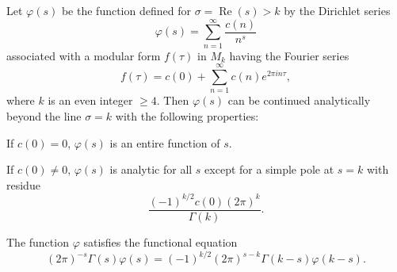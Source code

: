 Let $\varphi(s)$ be the function defined for $\sigma = \operatorname{Re}(s) > k$ by the Dirichlet series
$$\varphi(s) = \sum_{n=1}^{\infty} \frac{c(n)}{n^s}$$
associated with a modular form $f(\tau)$ in $M_k$ having the Fourier series
$$f(\tau) = c(0) + \sum_{n=1}^{\infty} c(n)e^{2\pi i n\tau},$$
where $k$ is an even integer $\geq 4$. Then $\varphi(s)$ can be continued analytically beyond the line $\sigma = k$ with the following properties:

 If $c(0) = 0$, $\varphi(s)$ is an entire function of $s$.

 If $c(0) \neq 0$, $\varphi(s)$ is analytic for all $s$ except for a simple pole at $s = k$ with residue
$$\frac{(-1)^{k/2}c(0)(2\pi)^k}{\Gamma(k)}.$$

 The function $\varphi$ satisfies the functional equation
$$(2\pi)^{-s}\Gamma(s)\varphi(s) = (-1)^{k/2}(2\pi)^{s-k}\Gamma(k-s)\varphi(k-s).$$
